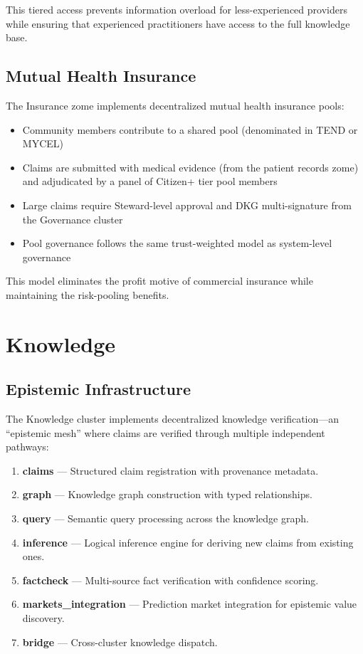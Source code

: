 \documentclass[12pt]{book}
\begin{document}
This tiered access prevents information overload for less-experienced
providers while ensuring that experienced practitioners have access to
the full knowledge base.

\section{Mutual Health Insurance}

The Insurance zome implements decentralized mutual health insurance pools:

\begin{itemize}
  \item Community members contribute to a shared pool (denominated in TEND
    or MYCEL)
  \item Claims are submitted with medical evidence (from the patient records
    zome) and adjudicated by a panel of Citizen+ tier pool members
  \item Large claims require Steward-level approval and DKG multi-signature
    from the Governance cluster
  \item Pool governance follows the same trust-weighted model as
    system-level governance
\end{itemize}

This model eliminates the profit motive of commercial insurance while
maintaining the risk-pooling benefits.


\chapter{Knowledge}
\label{ch:knowledge}

\section{Epistemic Infrastructure}

The Knowledge cluster implements decentralized knowledge verification---an
``epistemic mesh'' where claims are verified through multiple independent
pathways:

\begin{enumerate}
  \item \textbf{claims} --- Structured claim registration with provenance metadata.
  \item \textbf{graph} --- Knowledge graph construction with typed relationships.
  \item \textbf{query} --- Semantic query processing across the knowledge graph.
  \item \textbf{inference} --- Logical inference engine for deriving new claims
    from existing ones.
  \item \textbf{factcheck} --- Multi-source fact verification with confidence scoring.
  \item \textbf{markets\_integration} --- Prediction market integration for
    epistemic value discovery.
  \item \textbf{bridge} --- Cross-cluster knowledge dispatch.
\end{enumerate}
\end{document}
